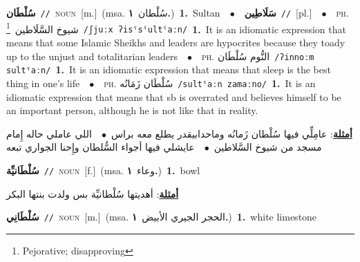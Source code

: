 \documentclass[10pt,a4paper,twoside]{article} %
\begin{document}
\begin{multicols}{2}
{\setlength\topsep{0pt}\textbf{\foreignlanguage{arabic}{سُلْطَان}}\ {\color{gray}\texttt{//}\color{black}}\ \textsc{noun}\ [m.]\ \color{gray}(msa. \foreignlanguage{arabic}{سُلْطان}~\foreignlanguage{arabic}{\textbf{١.}})\color{black}\ \textbf{1.}~Sultan\ \ $\bullet$\ \ \setlength\topsep{0pt}\textbf{\foreignlanguage{arabic}{سَلَاطِين}}\ {\color{gray}\texttt{//}\color{black}}\ [pl.]\ \ $\bullet$\ \ \textsc{ph.} \color{gray} \foreignlanguage{arabic}{شيوخ السَّلَاطين}\color{black}\ \footnote{Pejorative; disapproving}\ {\color{gray}\texttt{/{\sffamily ʃjuːx ʔisˤsˤultˤaːn}/}\color{black}}\ \textbf{1.}~It is an idiomatic expression that means that some Islamic Sheikhs and leaders are hypocrites because they toady up to the unjust and totalitarian leaders\ \ $\bullet$\ \ \textsc{ph.} \color{gray} \foreignlanguage{arabic}{النُّوم سُلْطَان}\color{black}\ {\color{gray}\texttt{/{\sffamily ʔinnoːm sultˤaːn}/}\color{black}}\ \textbf{1.}~It is an idiomatic expression that means that sleep is the best thing in one's life\ \ $\bullet$\ \ \textsc{ph.} \color{gray} \foreignlanguage{arabic}{سُلْطَان زَمَانُه}\color{black}\ {\color{gray}\texttt{/{\sffamily sultˤaːn zamaːno}/}\color{black}}\ \textbf{1.}~It is an idiomatic expression that means that sb is overrated and believes himself to be an important person, although he is not like that in reality.\  \begin{flushright}\color{gray}\foreignlanguage{arabic}{\textbf{\underline{\foreignlanguage{arabic}{أمثلة}}}: عامِلِّي فيها سُلْطان زَمانُه وماحدابيقدر يطلع معه براس\ $\bullet$\ \  اللي عاملي حاله إِمام مسجد من شيوخ السَّلاطين\ $\bullet$\ \  عايشلي فيها أجواء السُّلطان وإِحنا الجواري تبعه}\end{flushright}\color{black}} \vspace{2mm}

{\setlength\topsep{0pt}\textbf{\foreignlanguage{arabic}{سُلْطَانيِّة}}\ {\color{gray}\texttt{//}\color{black}}\ \textsc{noun}\ [f.]\ \color{gray}(msa. \foreignlanguage{arabic}{وعاء}~\foreignlanguage{arabic}{\textbf{١.}})\color{black}\ \textbf{1.}~bowl\  \begin{flushright}\color{gray}\foreignlanguage{arabic}{\textbf{\underline{\foreignlanguage{arabic}{أمثلة}}}: أهديتها سُلْطانيِّة بس ولدت بنتها البكر}\end{flushright}\color{black}} \vspace{2mm}

{\setlength\topsep{0pt}\textbf{\foreignlanguage{arabic}{سُلْطَانِي}}\ {\color{gray}\texttt{//}\color{black}}\ \textsc{noun}\ [m.]\ \color{gray}(msa. \foreignlanguage{arabic}{الحجر الجيري الأبيض}~\foreignlanguage{arabic}{\textbf{١.}})\color{black}\ \textbf{1.}~white limestone\ } \vspace{2mm}


\end{multicols}
\end{document}
